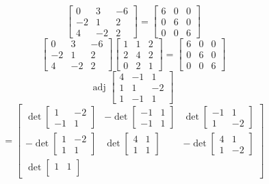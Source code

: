 \documentclass[12pt]{article}
\begin{document}
\begin{itemize}
$$\begin{bmatrix}
0 & 3 & -6 \\
-2 & 1 & 2 \\
4 & -2 & 2
\end{bmatrix} = \begin{bmatrix}
6 & 0 & 0 \\
0 & 6 & 0 \\
0 & 0 & 6
\end{bmatrix}$$
$$\begin{bmatrix}
0 & 3 & -6 \\
-2 & 1 & 2 \\
4 & -2 & 2
\end{bmatrix}\begin{bmatrix}
1 & 1 & 2 \\
2 & 4 & 2 \\
0 & 2 & 1
\end{bmatrix} = \begin{bmatrix}
6 & 0 & 0 \\
0 & 6 & 0 \\
0 & 0 & 6
\end{bmatrix}$$
$$\text{adj }\begin{bmatrix}
4 & -1 & 1 \\
1 & 1 & -2 \\
1 & -1 & 1
\end{bmatrix}$$
$$= \begin{bmatrix}
\det\begin{bmatrix}
1 & -2 \\
-1 & 1
\end{bmatrix} & -\det\begin{bmatrix}
-1 & 1 \\
-1 & 1
\end{bmatrix} & \det\begin{bmatrix}
-1 & 1 \\
1 & -2
\end{bmatrix} \\
-\det\begin{bmatrix}
1 & -2 \\
1 & 1
\end{bmatrix} & \det\begin{bmatrix}
4 & 1 \\
1 & 1
\end{bmatrix} & -\det\begin{bmatrix}
4 & 1 \\
1 & -2
\end{bmatrix} \\
\det\begin{bmatrix}
1 & 1 \\

\end{bmatrix}
\end{bmatrix}$$
\end{itemize}
\end{document}
